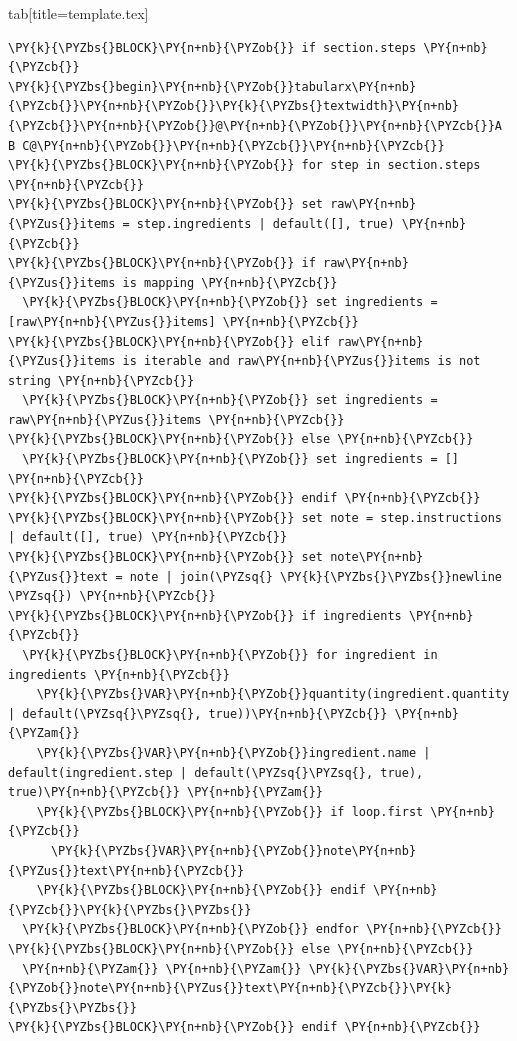 \documentclass[a4paper,twoside]{article}
\begin{document}
\begin{tsdiv}{tab}[title=template.tex]
\begin{tscode}[lang=tex, engine=pygments]
\begin{Verbatim}[commandchars=\\\{\},breaklines, breakanywhere, commandchars=\\\{\}]
\PY{k}{\PYZbs{}BLOCK}\PY{n+nb}{\PYZob{}} if section.steps \PY{n+nb}{\PYZcb{}}
\PY{k}{\PYZbs{}begin}\PY{n+nb}{\PYZob{}}tabularx\PY{n+nb}{\PYZcb{}}\PY{n+nb}{\PYZob{}}\PY{k}{\PYZbs{}textwidth}\PY{n+nb}{\PYZcb{}}\PY{n+nb}{\PYZob{}}@\PY{n+nb}{\PYZob{}}\PY{n+nb}{\PYZcb{}}A B C@\PY{n+nb}{\PYZob{}}\PY{n+nb}{\PYZcb{}}\PY{n+nb}{\PYZcb{}}
\PY{k}{\PYZbs{}BLOCK}\PY{n+nb}{\PYZob{}} for step in section.steps \PY{n+nb}{\PYZcb{}}
\PY{k}{\PYZbs{}BLOCK}\PY{n+nb}{\PYZob{}} set raw\PY{n+nb}{\PYZus{}}items = step.ingredients | default([], true) \PY{n+nb}{\PYZcb{}}
\PY{k}{\PYZbs{}BLOCK}\PY{n+nb}{\PYZob{}} if raw\PY{n+nb}{\PYZus{}}items is mapping \PY{n+nb}{\PYZcb{}}
  \PY{k}{\PYZbs{}BLOCK}\PY{n+nb}{\PYZob{}} set ingredients = [raw\PY{n+nb}{\PYZus{}}items] \PY{n+nb}{\PYZcb{}}
\PY{k}{\PYZbs{}BLOCK}\PY{n+nb}{\PYZob{}} elif raw\PY{n+nb}{\PYZus{}}items is iterable and raw\PY{n+nb}{\PYZus{}}items is not string \PY{n+nb}{\PYZcb{}}
  \PY{k}{\PYZbs{}BLOCK}\PY{n+nb}{\PYZob{}} set ingredients = raw\PY{n+nb}{\PYZus{}}items \PY{n+nb}{\PYZcb{}}
\PY{k}{\PYZbs{}BLOCK}\PY{n+nb}{\PYZob{}} else \PY{n+nb}{\PYZcb{}}
  \PY{k}{\PYZbs{}BLOCK}\PY{n+nb}{\PYZob{}} set ingredients = [] \PY{n+nb}{\PYZcb{}}
\PY{k}{\PYZbs{}BLOCK}\PY{n+nb}{\PYZob{}} endif \PY{n+nb}{\PYZcb{}}
\PY{k}{\PYZbs{}BLOCK}\PY{n+nb}{\PYZob{}} set note = step.instructions | default([], true) \PY{n+nb}{\PYZcb{}}
\PY{k}{\PYZbs{}BLOCK}\PY{n+nb}{\PYZob{}} set note\PY{n+nb}{\PYZus{}}text = note | join(\PYZsq{} \PY{k}{\PYZbs{}\PYZbs{}}newline \PYZsq{}) \PY{n+nb}{\PYZcb{}}
\PY{k}{\PYZbs{}BLOCK}\PY{n+nb}{\PYZob{}} if ingredients \PY{n+nb}{\PYZcb{}}
  \PY{k}{\PYZbs{}BLOCK}\PY{n+nb}{\PYZob{}} for ingredient in ingredients \PY{n+nb}{\PYZcb{}}
    \PY{k}{\PYZbs{}VAR}\PY{n+nb}{\PYZob{}}quantity(ingredient.quantity | default(\PYZsq{}\PYZsq{}, true))\PY{n+nb}{\PYZcb{}} \PY{n+nb}{\PYZam{}}
    \PY{k}{\PYZbs{}VAR}\PY{n+nb}{\PYZob{}}ingredient.name | default(ingredient.step | default(\PYZsq{}\PYZsq{}, true), true)\PY{n+nb}{\PYZcb{}} \PY{n+nb}{\PYZam{}}
    \PY{k}{\PYZbs{}BLOCK}\PY{n+nb}{\PYZob{}} if loop.first \PY{n+nb}{\PYZcb{}}
      \PY{k}{\PYZbs{}VAR}\PY{n+nb}{\PYZob{}}note\PY{n+nb}{\PYZus{}}text\PY{n+nb}{\PYZcb{}}
    \PY{k}{\PYZbs{}BLOCK}\PY{n+nb}{\PYZob{}} endif \PY{n+nb}{\PYZcb{}}\PY{k}{\PYZbs{}\PYZbs{}}
  \PY{k}{\PYZbs{}BLOCK}\PY{n+nb}{\PYZob{}} endfor \PY{n+nb}{\PYZcb{}}
\PY{k}{\PYZbs{}BLOCK}\PY{n+nb}{\PYZob{}} else \PY{n+nb}{\PYZcb{}}
  \PY{n+nb}{\PYZam{}} \PY{n+nb}{\PYZam{}} \PY{k}{\PYZbs{}VAR}\PY{n+nb}{\PYZob{}}note\PY{n+nb}{\PYZus{}}text\PY{n+nb}{\PYZcb{}}\PY{k}{\PYZbs{}\PYZbs{}}
\PY{k}{\PYZbs{}BLOCK}\PY{n+nb}{\PYZob{}} endif \PY{n+nb}{\PYZcb{}}

\end{Verbatim}
\end{tscode}
\end{tsdiv}
\end{document}
